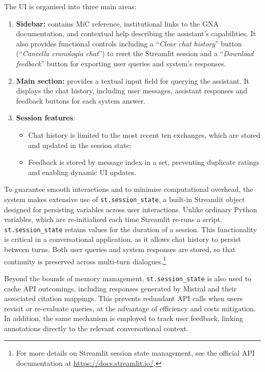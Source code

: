 \begin{spacing}{1.5}
\noindent The UI is organised into three main areas:
\begin{enumerate}
      \item \textbf{Sidebar:} contains MiC reference, institutional links to the GNA documentation, and contextual help describing the assistant’s capabilities. It also provides functional controls including a ``\textit{Clear chat history}'' button (``\textit{Cancella cronologia chat}'') to reset the Streamlit session and a ``\textit{Download feedback}'' button for exporting user queries and system's responses.
      \item \textbf{Main section:} provides a textual input field for querying the assistant. It displays the chat history, including user messages, assistant responses and feedback buttons for each system answer.
      \item \textbf{Session features}: 
      \begin{itemize}
            \item Chat history is limited to the most recent ten exchanges, which are stored and updated in the session state;
            \item Feedback is stored by message index in a set, preventing duplicate ratings and enabling dynamic UI updates.
      \end{itemize}
\end{enumerate}

To guarantee smooth interactions and to minimise computational overhead, the system makes extensive use of \texttt{st.session\_state}, a built-in Streamlit object designed for persisting variables across user interactions. Unlike ordinary Python variables, which are re-initialised each time Streamlit re-runs a script, \texttt{st.session\_state} retains values for the duration of a session. This functionality is critical in a conversational application, as it allows chat history to persist between turns. Both user queries and system responses are stored, so that continuity is preserved across multi-turn dialogues.\footnote{For more details on Streamlit session state management, see the official API documentation at \url{https://docs.streamlit.io/}.\nocite{noauthor_streamlit_2025}} 

Beyond the bounds of memory management, \texttt{st.session\_state} is also used to cache API outcomings, including responses generated by Mistral and their associated citation mappings. This prevents redundant API calls when users revisit or re-evaluate queries, at the advantage of efficiency and costs mitigation. In addition, the same mechanism is employed to track user feedback, linking annotations directly to the relevant conversational context.


\end{spacing}
